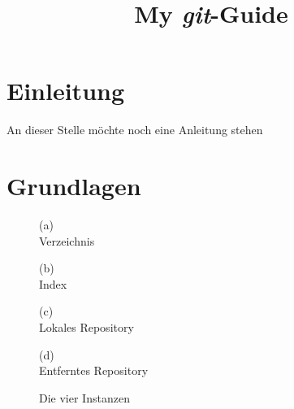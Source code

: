 
\usepackage{enumitem}
\usepackage{wasysym}
\usepackage{blindtext}
\usepackage{framed}
\usepackage{float}


\title{My \emph{git}-Guide}

\maketitle
\tableofcontents
\newpage
\section{Einleitung}
An dieser Stelle möchte noch eine Anleitung stehen \smiley
\newpage

\section{Grundlagen}									%
\begin{figure}
\centering
\caption{Die vier Instanzen}
\begin{minipage}{0.24\textwidth}
	\begin{framed} 		
	\centering 
	(a)\\
	\vspace{0,3cm}
	Verzeichnis \\
	\phantom{Repository}
	\vspace{1cm}
	\end{framed} 
\end{minipage}
\begin{minipage}{0.24\textwidth}
	\begin{framed} 		
	\centering 
	(b)\\
	\vspace{0,3cm}
	Index \\
	\phantom{Repository}
	\vspace{1cm}
	\end{framed} 
\end{minipage}
\begin{minipage}{0.24\textwidth}
	\begin{framed} 		
	\centering 
	(c)\\
	\vspace{0,3cm}
	Lokales Repository
	\vspace{1cm} 
	\end{framed} 
\end{minipage}
\begin{minipage}{0.24\textwidth}
	\begin{framed} 		
	\centering 
	(d)\\
	\vspace{0,3cm}
	Entferntes Repository 
	\vspace{1cm}
	\end{framed} 
\end{minipage}
\end{figure}

